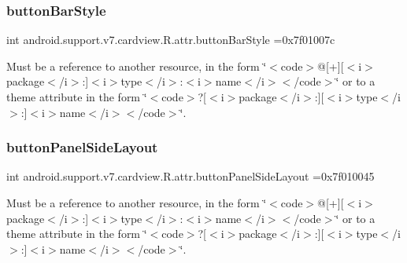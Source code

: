 \subsubsection{\texorpdfstring{button\+Bar\+Style}{buttonBarStyle}}
{\footnotesize\ttfamily int android.\+support.\+v7.\+cardview.\+R.\+attr.\+button\+Bar\+Style =0x7f01007c\hspace{0.3cm}{\ttfamily [static]}}

Must be a reference to another resource, in the form \char`\"{}$<$code$>$@\mbox{[}+\mbox{]}\mbox{[}$<$i$>$package$<$/i$>$\+:\mbox{]}$<$i$>$type$<$/i$>$\+:$<$i$>$name$<$/i$>$$<$/code$>$\char`\"{} or to a theme attribute in the form \char`\"{}$<$code$>$?\mbox{[}$<$i$>$package$<$/i$>$\+:\mbox{]}\mbox{[}$<$i$>$type$<$/i$>$\+:\mbox{]}$<$i$>$name$<$/i$>$$<$/code$>$\char`\"{}. \mbox{\label{classandroid_1_1support_1_1v7_1_1cardview_1_1R_1_1attr_ab3f73fc354c0fdde77226fff7a827c64}} 
\subsubsection{\texorpdfstring{button\+Panel\+Side\+Layout}{buttonPanelSideLayout}}
{\footnotesize\ttfamily int android.\+support.\+v7.\+cardview.\+R.\+attr.\+button\+Panel\+Side\+Layout =0x7f010045\hspace{0.3cm}{\ttfamily [static]}}

Must be a reference to another resource, in the form \char`\"{}$<$code$>$@\mbox{[}+\mbox{]}\mbox{[}$<$i$>$package$<$/i$>$\+:\mbox{]}$<$i$>$type$<$/i$>$\+:$<$i$>$name$<$/i$>$$<$/code$>$\char`\"{} or to a theme attribute in the form \char`\"{}$<$code$>$?\mbox{[}$<$i$>$package$<$/i$>$\+:\mbox{]}\mbox{[}$<$i$>$type$<$/i$>$\+:\mbox{]}$<$i$>$name$<$/i$>$$<$/code$>$\char`\"{}. \mbox{\label{classandroid_1_1support_1_1v7_1_1cardview_1_1R_1_1attr_a3c726b0f612e7a0056b16b933edf2d12}} 
